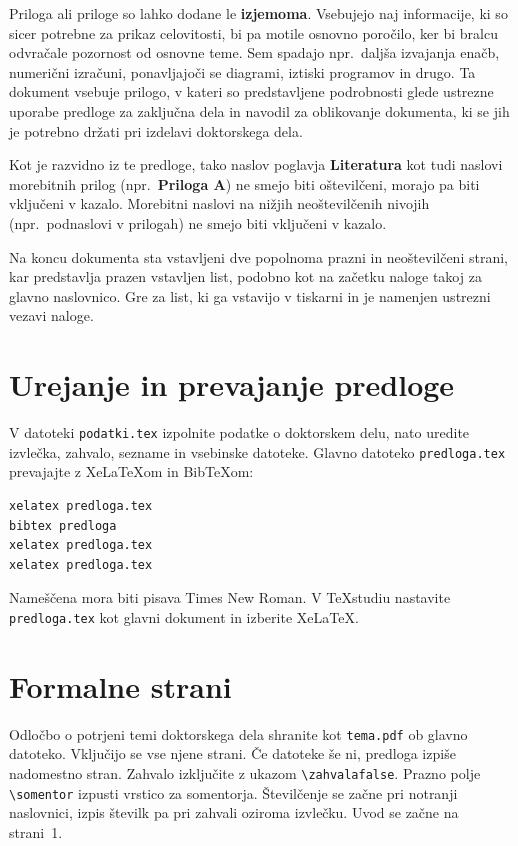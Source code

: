 \label{cha:priloga}
\setlength{\emergencystretch}{3em}
Priloga ali priloge so lahko dodane le \textbf{izjemoma}. Vsebujejo naj informacije, ki so sicer potrebne za prikaz celovitosti, bi pa motile osnovno poročilo, ker bi bralcu odvračale pozornost od osnovne teme. Sem spadajo npr.~daljša izvajanja enačb, numerični izračuni, ponavljajoči se diagrami, iztiski programov in drugo. Ta dokument vsebuje prilogo, v kateri so predstavljene podrobnosti glede ustrezne uporabe predloge za zaključna dela in navodil za oblikovanje dokumenta, ki se jih je potrebno držati pri izdelavi doktorskega dela.

Kot je razvidno iz te predloge, tako naslov poglavja \textbf{Literatura} kot tudi naslovi morebitnih prilog (npr.~\textbf{Priloga A}) ne smejo biti oštevilčeni, morajo pa biti vključeni v kazalo. Morebitni naslovi na nižjih neoštevilčenih nivojih (npr.~podnaslovi v prilogah) ne smejo biti vključeni v kazalo.

Na koncu dokumenta sta vstavljeni dve popolnoma prazni in neoštevilčeni strani, kar predstavlja prazen vstavljen list, podobno kot na začetku naloge takoj za glavno naslovnico. Gre za list, ki ga vstavijo v tiskarni in je namenjen ustrezni vezavi naloge.

\section*{Urejanje in prevajanje predloge}
V datoteki \texttt{podatki.tex} izpolnite podatke o doktorskem delu, nato uredite izvlečka, zahvalo, sezname in vsebinske datoteke. Glavno datoteko \texttt{predloga.tex} prevajajte z XeLaTeXom in BibTeXom:
\begin{verbatim}
xelatex predloga.tex
bibtex predloga
xelatex predloga.tex
xelatex predloga.tex
\end{verbatim}
Nameščena mora biti pisava Times New Roman. V TeXstudiu nastavite \texttt{predloga.tex} kot glavni dokument in izberite XeLaTeX.

\section*{Formalne strani}
Odločbo o potrjeni temi doktorskega dela shranite kot \texttt{tema.pdf} ob glavno datoteko. Vključijo se vse njene strani. Če datoteke še ni, predloga izpiše nadomestno stran. Zahvalo izključite z ukazom \verb|\zahvalafalse|. Prazno polje \verb|\somentor| izpusti vrstico za somentorja. Številčenje se začne pri notranji naslovnici, izpis številk pa pri zahvali oziroma izvlečku. Uvod se začne na strani~1.

